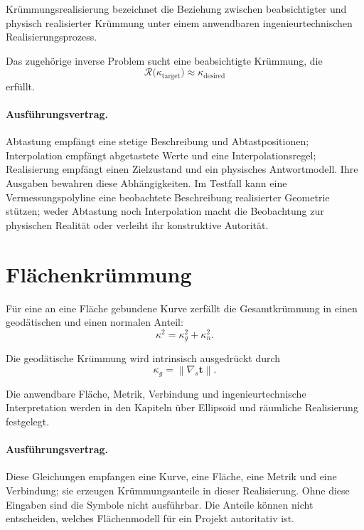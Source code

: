 \begin{definition}[Krümmungsrealisierung]
\label{def:curvature-realization}
Krümmungsrealisierung bezeichnet die Beziehung zwischen beabsichtigter und
physisch realisierter Krümmung unter einem anwendbaren ingenieurtechnischen
Realisierungsprozess.
\end{definition}

Das zugehörige inverse Problem sucht eine beabsichtigte Krümmung, die
\begin{equation}
\mathcal R\bigl(\kappa_{\mathrm{target}}\bigr)
\approx
\kappa_{\mathrm{desired}}
\label{eq:inverse-realization}
\end{equation}
erfüllt.

\paragraph{Ausführungsvertrag.}
Abtastung empfängt eine stetige Beschreibung und Abtastpositionen;
Interpolation empfängt abgetastete Werte und eine Interpolationsregel;
Realisierung empfängt einen Zielzustand und ein physisches Antwortmodell. Ihre
Ausgaben bewahren diese Abhängigkeiten. Im Testfall kann eine
Vermessungspolyline eine beobachtete Beschreibung realisierter Geometrie
stützen; weder Abtastung noch Interpolation macht die Beobachtung zur
physischen Realität oder verleiht ihr konstruktive Autorität.

\section{Flächenkrümmung}

Für eine an eine Fläche gebundene Kurve zerfällt die Gesamtkrümmung in einen
geodätischen und einen normalen Anteil:
\begin{equation}
\kappa^2=\kappa_g^2+\kappa_n^2.
\label{eq:curvature-decomposition}
\end{equation}

Die geodätische Krümmung wird intrinsisch ausgedrückt durch
\begin{equation}
\kappa_g
=
\left\|\nabla_s\mathbf t\right\|.
\label{eq:geodesic-curvature}
\end{equation}

Die anwendbare Fläche, Metrik, Verbindung und ingenieurtechnische
Interpretation werden in den Kapiteln über Ellipsoid und räumliche
Realisierung festgelegt.

\paragraph{Ausführungsvertrag.}
Diese Gleichungen empfangen eine Kurve, eine Fläche, eine Metrik und eine
Verbindung; sie erzeugen Krümmungsanteile in dieser Realisierung. Ohne diese
Eingaben sind die Symbole nicht ausführbar. Die Anteile können nicht
entscheiden, welches Flächenmodell für ein Projekt autoritativ ist.

